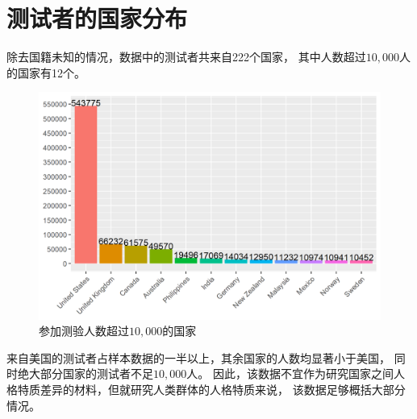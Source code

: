 \documentclass[UTF8]{ctexart}
\begin{document}
\section{测试者的国家分布}
除去国籍未知的情况，数据中的测试者共来自222个国家，
其中人数超过$10,000$人的国家有12个。
\begin{figure}[H]
  \centering
  \includegraphics[scale=0.79]{Country.png}
  \caption{参加测验人数超过$10,000$的国家}
\end{figure}
来自美国的测试者占样本数据的一半以上，其余国家的人数均显著小于美国，
同时绝大部分国家的测试者不足$10,000$人。
因此，该数据不宜作为研究国家之间人格特质差异的材料，但就研究人类群体的人格特质来说，
该数据足够概括大部分情况。
\end{document}
